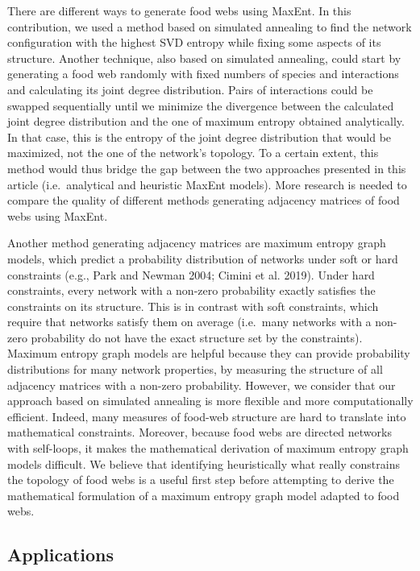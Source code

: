 \documentclass[10pt,oneside]{article}
\begin{document}
There are different ways to generate food webs using MaxEnt. In this
contribution, we used a method based on simulated annealing to find the
network configuration with the highest SVD entropy while fixing some
aspects of its structure. Another technique, also based on simulated
annealing, could start by generating a food web randomly with fixed
numbers of species and interactions and calculating its joint degree
distribution. Pairs of interactions could be swapped sequentially until
we minimize the divergence between the calculated joint degree
distribution and the one of maximum entropy obtained analytically. In
that case, this is the entropy of the joint degree distribution that
would be maximized, not the one of the network's topology. To a certain
extent, this method would thus bridge the gap between the two approaches
presented in this article (i.e.~analytical and heuristic MaxEnt models).
More research is needed to compare the quality of different methods
generating adjacency matrices of food webs using MaxEnt.

Another method generating adjacency matrices are maximum entropy graph
models, which predict a probability distribution of networks under soft
or hard constraints (e.g., Park and Newman 2004; Cimini et al. 2019).
Under hard constraints, every network with a non-zero probability
exactly satisfies the constraints on its structure. This is in contrast
with soft constraints, which require that networks satisfy them on
average (i.e.~many networks with a non-zero probability do not have the
exact structure set by the constraints). Maximum entropy graph models
are helpful because they can provide probability distributions for many
network properties, by measuring the structure of all adjacency matrices
with a non-zero probability. However, we consider that our approach
based on simulated annealing is more flexible and more computationally
efficient. Indeed, many measures of food-web structure are hard to
translate into mathematical constraints. Moreover, because food webs are
directed networks with self-loops, it makes the mathematical derivation
of maximum entropy graph models difficult. We believe that identifying
heuristically what really constrains the topology of food webs is a
useful first step before attempting to derive the mathematical
formulation of a maximum entropy graph model adapted to food webs.

\hypertarget{applications}{%
\subsection{Applications}\label{applications}}
\end{document}
